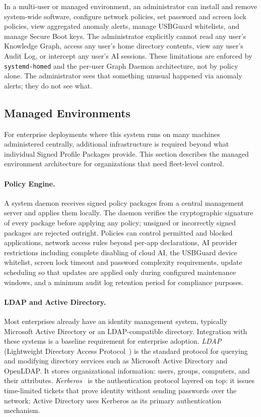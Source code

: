 In a multi-user or managed environment, an administrator can install and remove
system-wide software, configure network policies, set password and screen lock
policies, view aggregated anomaly alerts, manage USBGuard whitelists, and
manage Secure Boot keys. The administrator explicitly cannot read any user's
Knowledge Graph, access any user's home directory contents, view any user's
Audit Log, or intercept any user's AI sessions. These limitations are enforced
by \texttt{systemd-homed} and the per-user Graph Daemon architecture, not by
policy alone. The administrator sees that something unusual happened via
anomaly alerts; they do not see what.

\subsection{Managed Environments}
\label{sec:managed}

For enterprise deployments where this system runs on many machines administered
centrally, additional infrastructure is required beyond what individual Signed
Profile Packages provide. This section describes the managed environment
architecture for organizations that need fleet-level control.

\paragraph{Policy Engine.}
A system daemon receives signed policy packages from a central management
server and applies them locally. The daemon verifies the cryptographic
signature of every package before applying any policy; unsigned or incorrectly
signed packages are rejected outright. Policies can control permitted and
blocked applications, network access rules beyond per-app declarations, AI
provider restrictions including complete disabling of cloud AI, the USBGuard
device whitelist, screen lock timeout and password complexity requirements,
update scheduling so that updates are applied only during configured maintenance
windows, and a minimum audit log retention period for compliance purposes.

\paragraph{LDAP and Active Directory.}
Most enterprises already have an identity management system, typically
Microsoft Active Directory or an LDAP-compatible directory. Integration
with these systems is a baseline requirement for enterprise adoption.
\emph{LDAP} (Lightweight Directory Access Protocol~\cite{rfc4511}) is the
standard protocol for querying and modifying directory services such as
Microsoft Active Directory and OpenLDAP. It stores organizational information:
users, groups, computers, and their attributes. \emph{Kerberos}~\cite{rfc4120}
is the authentication protocol layered on top: it issues time-limited tickets
that prove identity without sending passwords over the network; Active Directory
uses Kerberos as its primary authentication mechanism.


